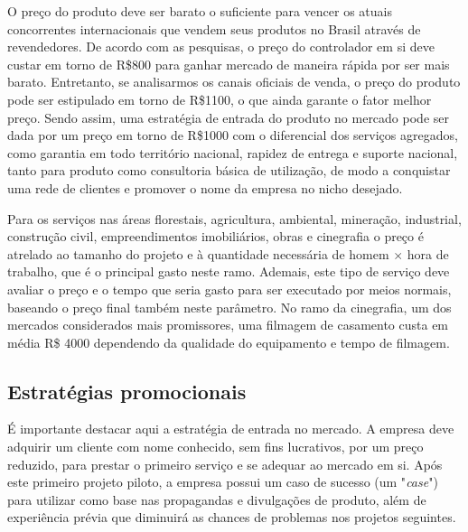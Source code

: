 
O preço do produto deve ser barato o suficiente para vencer os 
atuais concorrentes internacionais que vendem seus produtos no 
Brasil através de revendedores. De acordo com as pesquisas, o 
preço do controlador em si deve custar em torno de R\$800 para 
ganhar mercado de maneira rápida por ser mais barato. Entretanto, 
se analisarmos os canais oficiais de venda, o preço do produto 
pode ser estipulado em torno de R\$1100, o que ainda garante o 
fator melhor preço. Sendo assim, uma estratégia de entrada do 
produto no mercado pode ser dada por um preço em torno de R\$1000 com o 
diferencial dos serviços agregados, como garantia em todo território 
nacional, rapidez de entrega e suporte nacional, tanto para produto 
como consultoria básica de utilização, de modo a conquistar uma 
rede de clientes e promover o nome da empresa no nicho desejado.

Para os serviços nas áreas florestais, agricultura, ambiental, mineração, 
industrial, construção civil, empreendimentos imobiliários, 
obras e cinegrafia o preço é atrelado ao tamanho do projeto e 
à quantidade necessária de homem $\times$ hora de trabalho, que é o principal 
gasto neste ramo. Ademais, este tipo de serviço deve avaliar o preço
e o tempo que seria gasto para ser executado por meios normais,
baseando o preço final também neste parâmetro.
No ramo da cinegrafia, um dos mercados considerados 
mais promissores, uma filmagem de casamento custa em média 
R\$ 4000 dependendo da qualidade do equipamento e tempo de filmagem.

\subsection{Estratégias promocionais}


É importante destacar aqui a estratégia de entrada no mercado. 
A empresa deve adquirir um cliente com nome conhecido, sem fins 
lucrativos, por um preço reduzido, para prestar o primeiro serviço e 
se adequar ao mercado em si. Após este primeiro projeto piloto, a 
empresa possui um caso de sucesso (um "\emph{case}") para utilizar como 
base nas propagandas e divulgações de produto, além de experiência 
prévia que diminuirá as chances de problemas nos projetos seguintes.

